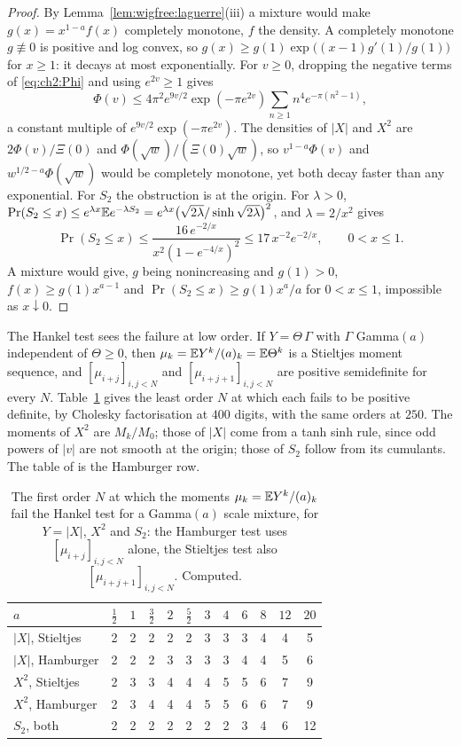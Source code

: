 \begin{proof}
By Lemma~\ref{lem:wigfree:laguerre}(iii) a mixture would make $g(x)=x^{1-a}f(x)$ completely monotone, $f$ the density. A completely monotone $g\not\equiv0$ is positive and log convex, so $g(x)\ge g(1)\exp\big((x-1)g'(1)/g(1)\big)$ for $x\ge1$: it decays at most exponentially. For $v\ge0$, dropping the negative terms of \eqref{eq:ch2:Phi} and using $e^{2v}\ge1$ gives
\[
\Phi(v)\le4\pi^2e^{9v/2}\exp(-\pi e^{2v})\sum_{n\ge1}n^4e^{-\pi(n^2-1)},
\]
a constant multiple of $e^{9v/2}\exp(-\pi e^{2v})$. The densities of $|X|$ and $X^2$ are $2\Phi(v)/\Xi(0)$ and $\Phi(\sqrt w)/(\Xi(0)\sqrt w)$, so $v^{1-a}\Phi(v)$ and $w^{1/2-a}\Phi(\sqrt w)$ would be completely monotone, yet both decay faster than any exponential. For $S_2$ the obstruction is at the origin. For $\lambda>0$, $\Pr(S_2\le x)\le e^{\lambda x}\mathbb{E} e^{-\lambda S_2}=e^{\lambda x}\big(\sqrt{2\lambda}/\sinh\sqrt{2\lambda}\big)^2$, and $\lambda=2/x^2$ gives
\[
\Pr(S_2\le x)\le\frac{16\,e^{-2/x}}{x^2(1-e^{-4/x})^2}\le17\,x^{-2}e^{-2/x},\qquad0<x\le1 .
\]
A mixture would give, $g$ being nonincreasing and $g(1)>0$, $f(x)\ge g(1)x^{a-1}$ and $\Pr(S_2\le x)\ge g(1)x^a/a$ for $0<x\le1$, impossible as $x\downarrow0$.
\end{proof}

The Hankel test sees the failure at low order. If $Y=\Theta\,\Gamma$ with $\Gamma$ Gamma$(a)$ independent of $\Theta\ge0$, then $\mu_k=\mathbb{E} Y^k/(a)_k=\mathbb{E}\Theta^k$ is a Stieltjes moment sequence, and $[\mu_{i+j}]_{i,j<N}$ and $[\mu_{i+j+1}]_{i,j<N}$ are positive semidefinite for every $N$. Table~\ref{tab:wigfree:hankel} gives the least order $N$ at which each fails to be positive definite, by Cholesky factorisation at $400$ digits, with the same orders at $250$. The moments of $X^2$ are $M_k/M_0$; those of $|X|$ come from a tanh sinh rule, since odd powers of $|v|$ are not smooth at the origin; those of $S_2$ follow from its cumulants. The table of \cite{P26wig} is the Hamburger row.

\begin{table}[htbp]
\centering\footnotesize
\setlength{\tabcolsep}{4pt}
\begin{tabular}{lccccccccccc}
\toprule
$a$ & $\frac12$ & $1$ & $\frac32$ & $2$ & $\frac52$ & $3$ & $4$ & $6$ & $8$ & $12$ & $20$\\
\midrule
$|X|$, Stieltjes & 2 & 2 & 2 & 2 & 2 & 3 & 3 & 3 & 4 & 4 & 5\\
$|X|$, Hamburger & 2 & 2 & 2 & 3 & 3 & 3 & 3 & 4 & 4 & 5 & 6\\
$X^2$, Stieltjes & 2 & 3 & 3 & 4 & 4 & 4 & 5 & 5 & 6 & 7 & 9\\
$X^2$, Hamburger & 2 & 3 & 4 & 4 & 4 & 5 & 5 & 6 & 6 & 7 & 9\\
$S_2$, both & 2 & 2 & 2 & 2 & 2 & 2 & 2 & 3 & 4 & 6 & 12\\
\bottomrule
\end{tabular}
\caption{The first order $N$ at which the moments $\mu_k=\mathbb{E} Y^k/(a)_k$ fail the Hankel test for a Gamma$(a)$ scale mixture, for $Y=|X|$, $X^2$ and $S_2$: the Hamburger test uses $[\mu_{i+j}]_{i,j<N}$ alone, the Stieltjes test also $[\mu_{i+j+1}]_{i,j<N}$. Computed.}
\label{tab:wigfree:hankel}
\end{table}

